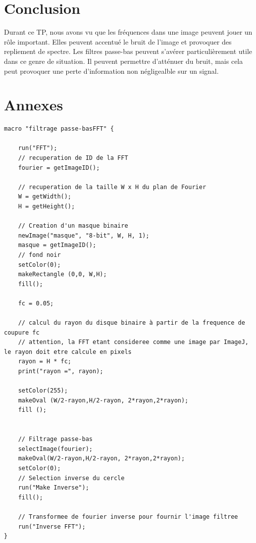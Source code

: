 \documentclass[a4paper,11pt]{article}
\begin{document}
  \section{Conclusion}
  Durant ce TP, nous avons vu que les fréquences dans une image peuvent jouer un rôle important. Elles peuvent
  accentué le bruit de l'image et provoquer des repliement de spectre. Les filtres passe-bas peuvent s'avérer
  particulièrement utile dans ce genre de situation. Il peuvent permettre d'atténuer du bruit, mais cela peut
  provoquer une perte d'information non négligealble sur un signal.
  
  \newpage
  \section{Annexes}
  \begin{lstlisting}[caption=Macro d'atténuation du phénomène de Moiré]
macro "filtrage passe-basFFT" {

    run("FFT");
    // recuperation de ID de la FFT
    fourier = getImageID();

    // recuperation de la taille W x H du plan de Fourier
    W = getWidth();
    H = getHeight();

    // Creation d'un masque binaire
    newImage("masque", "8-bit", W, H, 1);
    masque = getImageID();
    // fond noir
    setColor(0);
    makeRectangle (0,0, W,H);
    fill();

    fc = 0.05;

    // calcul du rayon du disque binaire à partir de la frequence de coupure fc
    // attention, la FFT etant consideree comme une image par ImageJ, le rayon doit etre calcule en pixels
    rayon = H * fc;
    print("rayon =", rayon);

    setColor(255);
    makeOval (W/2-rayon,H/2-rayon, 2*rayon,2*rayon);
    fill ();


    // Filtrage passe-bas
    selectImage(fourier);
    makeOval(W/2-rayon,H/2-rayon, 2*rayon,2*rayon);
    setColor(0);
    // Selection inverse du cercle
    run("Make Inverse");
    fill();

    // Transformee de fourier inverse pour fournir l'image filtree
    run("Inverse FFT");
}
  \end{lstlisting}
\end{document}
